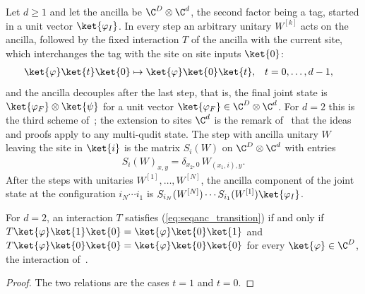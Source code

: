 \begin{definition}
    \label{def:seqanc_transition}
    \leanok
    Let $d\ge 1$ and let the ancilla be $\C^D\otimes\C^d$, the second factor
    being a tag, started in a unit vector $\ket{\varphi_I}$. In every step an
    arbitrary unitary $W^{[k]}$ acts on the ancilla, followed by the fixed
    interaction $T$ of the ancilla with the current site, which interchanges
    the tag with the site on site inputs $\ket{0}$:
    \begin{align}
        \ket{\varphi}\ket{t}\ket{0}
         & \mapsto\ket{\varphi}\ket{0}\ket{t},
         & t                                   & =0,\dots,d-1,
        \label{eq:seqanc_transition}
    \end{align}
    and the ancilla decouples after the last step, that is, the final joint
    state is $\ket{\varphi_F}\otimes\ket{\psi}$ for a unit vector
    $\ket{\varphi_F}\in\C^D\otimes\C^d$. For $d=2$ this is the third scheme
    of~\cite[Section~5.1]{PerezGarcia2007Matrix}; the extension to sites
    $\C^d$ is the remark of~\cite{Schoen2005Sequential} that the ideas and
    proofs apply to any multi-qudit state. The step with ancilla unitary $W$
    leaving the site in $\ket{i}$ is the matrix $S_i(W)$ on $\C^D\otimes\C^d$
    with entries
    \begin{align}
        S_i(W)_{x,y}=\delta_{x_2,0}\,W_{(x_1,i),y}.
        \label{eq:seqanc_transition_step}
    \end{align}
    After the steps with unitaries $W^{[1]},\dots,W^{[N]}$, the ancilla
    component of the joint state at the configuration $i_N\cdots i_1$ is
    $S_{i_N}(W^{[N]})\cdots S_{i_1}(W^{[1]})\ket{\varphi_I}$.
\end{definition}

\begin{lemma}
    \label{thm:seqanc_transition_qubit}
    \leanok
    For $d=2$, an interaction $T$ satisfies (\ref{eq:seqanc_transition}) if
    and only if
    $T\ket{\varphi}\ket{1}\ket{0}=\ket{\varphi}\ket{0}\ket{1}$ and
    $T\ket{\varphi}\ket{0}\ket{0}=\ket{\varphi}\ket{0}\ket{0}$ for every
    $\ket{\varphi}\in\C^D$, the interaction
    of~\cite[Section~5.1]{PerezGarcia2007Matrix}.
\end{lemma}
\begin{proof}
    \leanok
    The two relations are the cases $t=1$ and $t=0$.
\end{proof}

